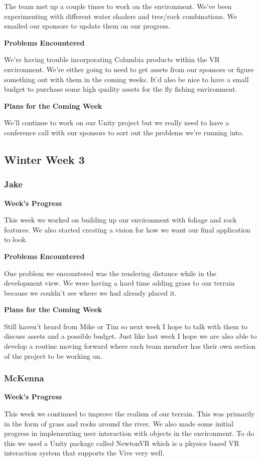 \documentclass[10pt,journal,compsoc,onecolumn, draftclsnofoot]{IEEEtran}
\begin{document}
The team met up a couple times to work on the environment. We've been experimenting with different water shaders and tree/rock combinations. We emailed our sponsors to update them on our progress.

\noindent \textbf{Problems Encountered}

We're having trouble incorporating Columbia products within the VR environment. We're either going to need to get assets from our sponsors or figure something out with them in the coming weeks. It'd also be nice to have a small budget to purchase some high quality assets for the fly fishing environment.

\noindent \textbf{Plans for the Coming Week}

We'll continue to work on our Unity project but we really need to have a conference call with our sponsors to sort out the problems we're running into.

\subsection{Winter Week 3}
\subsubsection{Jake}
\noindent \textbf{Week's Progress}

This week we worked on building up our environment with foliage and rock features. We also started creating a vision for how we want our final application to look.

\noindent \textbf{Problems Encountered}

One problem we encountered was the rendering distance while in the development view. We were having a hard time adding grass to our terrain because we couldn't see where we had already placed it.

\noindent \textbf{Plans for the Coming Week}

Still haven't heard from Mike or Tim so next week I hope to talk with them to discuss assets and a possible budget. Just like last week I hope we are also able to develop a routine moving forward where each team member has their own section of the project to be working on.

\subsubsection{McKenna}
\noindent \textbf{Week's Progress}

This week we continued to improve the realism of our terrain. This was primarily in the form of grass and rocks around the river. We also made some initial progress in implementing user interaction with objects in the environment. To do this we used a Unity package called NewtonVR which is a physics based VR interaction system that supports the Vive very well.
\end{document}
